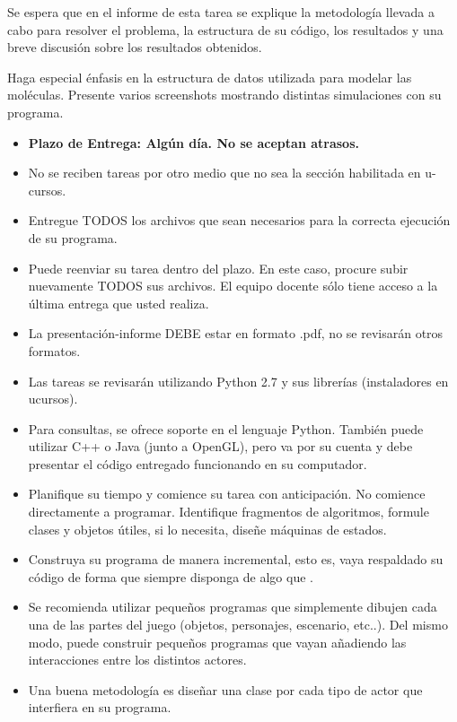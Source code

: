 \documentclass[letterpaper,11pt]{article} %
\def\plazoentrega {Algún día}
\begin{document}

Se espera que en el informe de esta tarea se explique la metodología llevada a cabo para resolver el problema, la estructura de su código, los resultados y una breve discusión sobre los resultados obtenidos. 

\newp Haga especial énfasis en la estructura de datos utilizada para modelar las moléculas. Presente varios screenshots mostrando distintas simulaciones con su programa.


\begin{itemize}
	\item \textbf{Plazo de Entrega: \plazoentrega. No se aceptan atrasos.}
	\item No se reciben tareas por otro medio que no sea la sección habilitada en u-cursos.
	\item Entregue TODOS los archivos que sean necesarios para la correcta ejecución de su programa.
	\item Puede reenviar su tarea dentro del plazo. En este caso, procure subir nuevamente TODOS sus archivos. El equipo docente sólo tiene acceso a la última entrega que usted realiza.
	\item La presentación-informe DEBE estar en formato .pdf, no se revisarán otros formatos.
	\item Las tareas se revisarán utilizando Python 2.7 y sus librerías (instaladores en ucursos).
	\item Para consultas, se ofrece soporte en el lenguaje Python. También puede utilizar C++ o Java (junto a OpenGL), pero va por su cuenta y debe presentar el código entregado funcionando en su computador.
\end{itemize}


\begin{itemize}
	\item Planifique su tiempo y comience su tarea con anticipación. No comience directamente a programar. Identifique fragmentos de algoritmos, formule clases y objetos útiles, si lo necesita, diseñe máquinas de estados.
	\item Construya su programa de manera incremental, esto es, vaya respaldado su código de forma que siempre disponga de algo que .
	\item Se recomienda utilizar pequeños programas que simplemente dibujen cada una de las partes del juego (objetos, personajes, escenario, etc..). Del mismo modo, puede construir pequeños programas que vayan añadiendo las interacciones entre los distintos actores.
	\item Una buena metodología es diseñar una clase por cada tipo de actor que interfiera en su programa.
\end{itemize}

\end{document}
